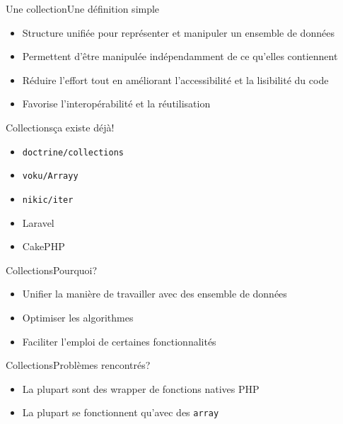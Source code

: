 \begin{frame}{Une collection}{Une définition simple}
    \begin{itemize}[<+->]
        \item Structure unifiée pour représenter et manipuler un ensemble de données
        \item Permettent d'être manipulée indépendamment de ce qu'elles contiennent
        \item Réduire l'effort tout en améliorant l'accessibilité et la lisibilité du code
        \item Favorise l'interopérabilité et la réutilisation
    \end{itemize}
\end{frame}

\begin{frame}{Collections}{ça existe déjà!}
    \begin{itemize}[<+->]
        \item \texttt{doctrine/collections}
        \item \texttt{voku/Arrayy}
        \item \texttt{nikic/iter}
        \item Laravel
        \item CakePHP
    \end{itemize}
\end{frame}

\begin{frame}{Collections}{Pourquoi?}
    \begin{itemize}[<+->]
        \item Unifier la manière de travailler avec des ensemble de données
        \item Optimiser les algorithmes
        \item Faciliter l'emploi de certaines fonctionnalités
    \end{itemize}
\end{frame}

\begin{frame}{Collections}{Problèmes rencontrés?}
    \begin{itemize}[<+->]
        \item La plupart sont des wrapper de fonctions natives PHP
        \item La plupart se fonctionnent qu'avec des \texttt{array}
    \end{itemize}
\end{frame}
